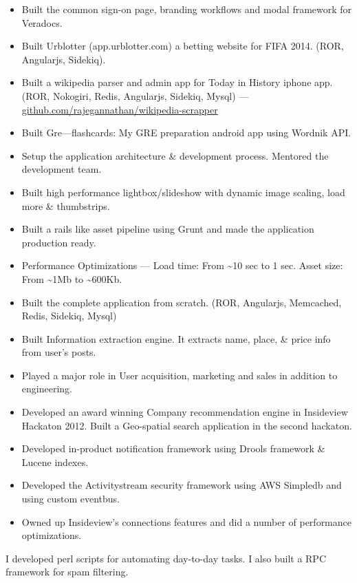 \documentclass{resume}
\begin{document}
\begin{itemize} \itemsep1pt \parskip0pt
  \item Built the common sign-on page, branding workflows and modal framework for Veradocs.
  \item Built Urblotter (app.urblotter.com) a betting website for FIFA 2014. (ROR, Angularjs, Sidekiq).
  \item Built a wikipedia parser and admin app for Today in History iphone app. (ROR, Nokogiri, Redis, Angularjs, Sidekiq, Mysql) --- \url{github.com/rajegannathan/wikipedia-scrapper}
  \item Built Gre---flashcards: My GRE preparation android app using Wordnik API\@.
\end{itemize}
\begin{itemize} \itemsep1pt \parskip0pt
  \item Setup the application architecture \& development process. Mentored the development team.
  \item Built high performance lightbox/slideshow with dynamic image scaling, load more \& thumbstrips.
  \item Built a rails like asset pipeline using Grunt and made the application production ready.
  \item Performance Optimizations --- Load time: From \textasciitilde10 sec to 1 sec.  Asset size: From \textasciitilde1Mb to \textasciitilde600Kb.
\end{itemize}
\begin{itemize} \itemsep1pt \parskip0pt
  \item Built the complete application from scratch. (ROR, Angularjs, Memcached, Redis, Sidekiq, Mysql)
  \item Built Information extraction engine. It extracts name, place, \& price info from user's posts.
  \item Played a major role in User acquisition, marketing and sales in addition to engineering. 
\end{itemize}
\begin{itemize} \itemsep1pt \parskip0pt
  \item Developed an award winning Company recommendation engine in Insideview Hackaton 2012.  Built a Geo-spatial search application in the second hackaton.
  \item Developed in-product notification framework using Drools framework \& Lucene indexes.
  \item Developed the Activitystream security framework using AWS Simpledb and using custom eventbus.
  \item Owned up Insideview's connections features and did a number of performance optimizations.
\end{itemize}
I developed perl scripts for automating day-to-day tasks.  I also built a RPC framework for spam filtering.
 
\end{document}
